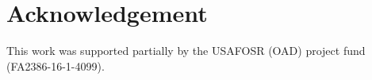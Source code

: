 \section{Acknowledgement} \label{sec8}
\noindent
This work was supported partially by the USAFOSR (OAD) project fund (FA2386-16-1-4099).